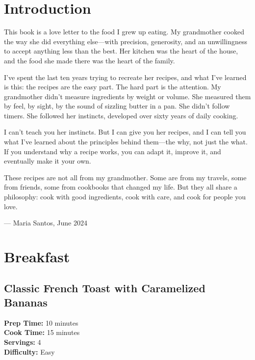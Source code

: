 \documentclass[
    language=english,
    doctype=recipe-book,
    institution=none,
]{../../omnilatex}
\begin{document}
\maketitle

\frontmatter

\chapter*{Introduction}

This book is a love letter to the food I grew up eating. My grandmother cooked the way she did everything else---with precision, generosity, and an unwillingness to accept anything less than the best. Her kitchen was the heart of the house, and the food she made there was the heart of the family.

I've spent the last ten years trying to recreate her recipes, and what I've learned is this: the recipes are the easy part. The hard part is the attention. My grandmother didn't measure ingredients by weight or volume. She measured them by feel, by sight, by the sound of sizzling butter in a pan. She didn't follow timers. She followed her instincts, developed over sixty years of daily cooking.

I can't teach you her instincts. But I can give you her recipes, and I can tell you what I've learned about the principles behind them---the why, not just the what. If you understand why a recipe works, you can adapt it, improve it, and eventually make it your own.

These recipes are not all from my grandmother. Some are from my travels, some from friends, some from cookbooks that changed my life. But they all share a philosophy: cook with good ingredients, cook with care, and cook for people you love.

--- Maria Santos, June 2024

\tableofcontents

\mainmatter

\chapter{Breakfast}

\section*{Classic French Toast with Caramelized Bananas}

\begin{recipebox}
\textbf{Prep Time:} 10 minutes\\
\textbf{Cook Time:} 15 minutes\\
\textbf{Servings:} 4\\
\textbf{Difficulty:} Easy
\end{recipebox}
\end{document}
